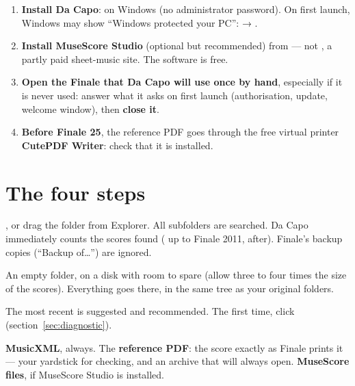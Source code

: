 \begin{enumerate}
\item \textbf{Install Da Capo}:  on Windows (no administrator password).
      On first launch, Windows may show “Windows protected your PC”:  →
      .
\item \textbf{Install MuseScore Studio} (optional but recommended) from 
      — not , a partly paid sheet-music site. The software is free.
\item \textbf{Open the Finale that Da Capo will use once by hand}, especially if it is never used:
      answer what it asks on first launch (authorisation, update, welcome window), then
      \textbf{close it}.
\item \textbf{Before Finale 25}, the reference PDF goes through the free virtual printer
      \textbf{CutePDF Writer}: check that it is installed.
\end{enumerate}


\section{The four steps}


\begin{description}[style=nextline,leftmargin=5mm,font=\sffamily\bfseries\color{bordeaux}]
\item[1. Where are your Finale scores?]
, or drag the folder from Explorer. All subfolders are searched. Da Capo
immediately counts the scores found ( up to Finale 2011,  after).
Finale's backup copies (“Backup of…”) are ignored.
\item[2. Where to put the result?]
An empty folder, on a disk with room to spare (allow three to four times the size of the scores).
Everything goes there, in the same tree as your original folders.
\item[3. With which Finale?]
The most recent is suggested and recommended. The first time, click 
(section~\ref{sec:diagnostic}).
\item[4. What to produce?]
\textbf{MusicXML}, always. The \textbf{reference PDF}: the score exactly as Finale prints it — your
yardstick for checking, and an archive that will always open. \textbf{MuseScore files}, if MuseScore
Studio is installed.
\end{description}

